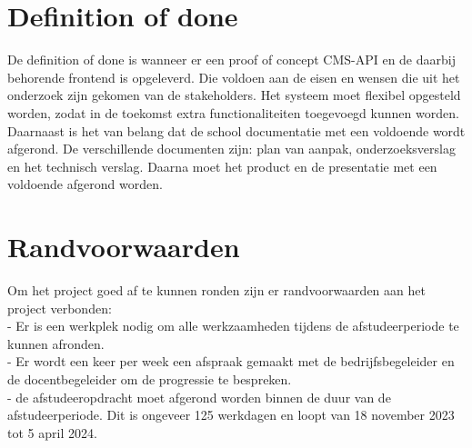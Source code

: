 \section{Definition of done}
De definition of done is wanneer er een proof of concept \gls{CMS}-API en de daarbij behorende frontend is opgeleverd. 
Die voldoen aan de  eisen en wensen die uit het onderzoek zijn gekomen van de stakeholders.
Het systeem moet flexibel opgesteld worden, zodat in de toekomst extra functionaliteiten toegevoegd kunnen worden.
Daarnaast is het van belang dat de school documentatie met een voldoende wordt afgerond.
De verschillende documenten zijn: plan van aanpak, onderzoeksverslag en het technisch verslag.
Daarna moet het product en de presentatie met een voldoende afgerond worden.
\section{Randvoorwaarden}
Om het project goed af te kunnen ronden zijn er randvoorwaarden aan het project verbonden: \\
- Er is een werkplek nodig om alle werkzaamheden tijdens de afstudeerperiode te kunnen afronden.\\
- Er wordt een keer per week een afspraak gemaakt met de bedrijfsbegeleider en de docentbegeleider om de progressie te bespreken. \\ 
- de afstudeeropdracht moet afgerond worden binnen de duur van de afstudeerperiode. 
Dit is ongeveer 125 werkdagen en loopt van 18 november 2023 tot 5 april 2024.
